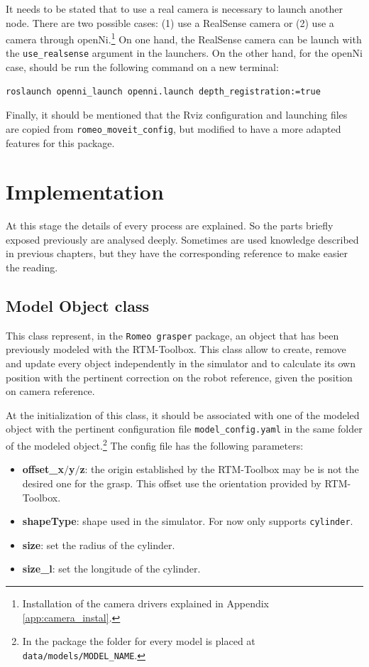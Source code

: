 \documentclass[12pt,a4paper,final,twoside,openright]{report}
\begin{document}
It needs to be stated that to use a real camera is necessary to launch another node. There are two possible cases: (1) use a RealSense camera or (2) use a camera through openNi.\footnote{Installation of the camera drivers explained in Appendix \ref{app:camera_instal}.} On one hand, the RealSense camera can be launch with the \texttt{use\_realsense} argument in the launchers. On the other hand, for the openNi case, should be run the following command on a new terminal:

\begin{lstlisting}[language=ROS]
roslaunch openni_launch openni.launch depth_registration:=true
\end{lstlisting}

Finally, it should be mentioned that the Rviz configuration and launching files are copied from \texttt{romeo\_moveit\_config}, but modified to have a more adapted features for this package. 


\chapter{Implementation}
\label{ch:implementation}

At this stage the details of every process are explained. So the parts briefly exposed previously are analysed deeply. Sometimes are used knowledge described in previous chapters, but they have the corresponding reference to make easier the reading.

\section{Model Object class}
\label{sec:model_object}

This class represent, in the \texttt{Romeo grasper} package, an object that has been previously modeled with the RTM-Toolbox. This class allow to create, remove and update every object independently in the simulator and to calculate its own position with the pertinent correction on the robot reference, given the position on camera reference. 

At the initialization of this class, it should be associated with one of the modeled object with the pertinent configuration file \texttt{model\_config.yaml} in the same folder of the modeled object.\footnote{In the package the folder for every model is placed at \texttt{data/models/MODEL\_NAME}.} The config file has the following parameters:

\begin{itemize}
\item \textbf{offset\_x$/$y$/$z}: the origin established by the RTM-Toolbox may be is not the desired one for the grasp. This offset use the orientation provided by RTM-Toolbox.
\item \textbf{shapeType}: shape used in the simulator. For now only supports \texttt{cylinder}.
\item \textbf{size}: set the radius of the cylinder.
\item \textbf{size\_l}: set the longitude of the cylinder.
\end{itemize}
\end{document}
